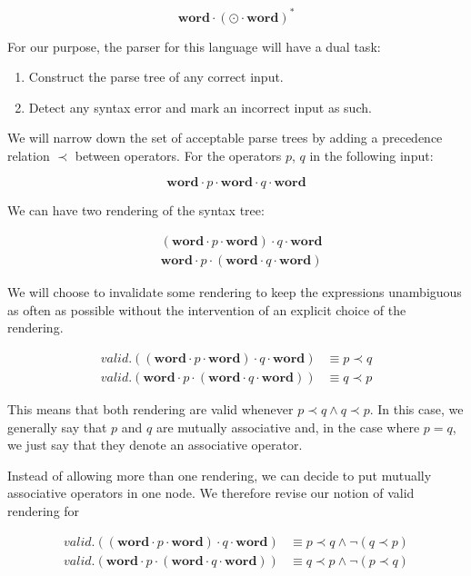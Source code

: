 \documentclass[10pt]{report}
\newcommand{\word}{\textbf{word}}
\newcounter{i}
\begin{document}
\[   \textbf{word} \cdot (\odot \cdot \textbf{word} ) ^ {*} \]

For our purpose, the parser for this language will have a dual task:

\begin{enumerate}
	\item Construct the parse tree of any correct input.
	\item Detect any syntax error and mark an incorrect input as such.
\end{enumerate}

We will narrow down the set of acceptable parse trees by adding a precedence relation $\prec$ between operators.  For the operators $p$, $q$ in the following input:

\[ \word \cdot p \cdot \word \cdot q \cdot \word \]

We can have two rendering of the syntax tree:

\begin{align}
	& (\word \cdot p \cdot \word ) \cdot q \cdot \word \label{leftrendering} \\
	& \word \cdot p \cdot (\word \cdot q \cdot \word ) \label{rightrendering}
\end{align}

We will choose to invalidate some rendering to keep the expressions unambiguous as often as possible without the intervention of an explicit choice of the rendering.

\begin{align*}
	valid.((\word \cdot p \cdot \word ) \cdot q \cdot \word) & \equiv p \prec q\\
	valid.(\word \cdot p \cdot (\word \cdot q \cdot \word )) & \equiv q \prec p
\end{align*}

This means that both rendering are valid whenever $p \prec q \land q \prec p$.  In this case, we generally say that $p$ and $q$ are mutually associative and, in the case where $p = q$, we just say that they denote an associative operator. 

Instead of allowing more than one rendering, we can decide to put mutually associative operators in one node.  We therefore revise our notion of valid rendering for

\begin{align*}
	valid.((\word \cdot p \cdot \word ) \cdot q \cdot \word) & \equiv p \prec q \land \neg (q \prec p) \\
	valid.(\word \cdot p \cdot (\word \cdot q \cdot \word )) & \equiv q \prec p \land \neg (p \prec q)
\end{align*}
\end{document}
